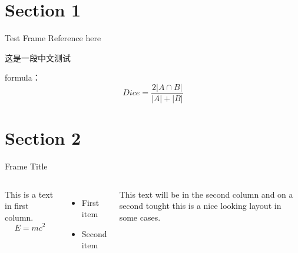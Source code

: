 \section{Section 1}
\begin{frame}[c]{Test Frame} %
    Reference here \cite{Cheplygina2018NotsosupervisedAS}
    
    这是一段中文测试
    
    formula：
    \[Dice = \frac{2 |A \cap B|}{|A| + |B|}\]
\end{frame}
 
\section{Section 2}
\begin{frame}[c]{Frame Title}
    \begin{columns}
    This is a text in first column.
    $$E=mc^2$$
    \begin{itemize}
    \item First item
    \item Second item
    \end{itemize}
     
    This text will be in the second column
    and on a second tought this is a nice looking
    layout in some cases.
    \end{columns}
\end{frame}


